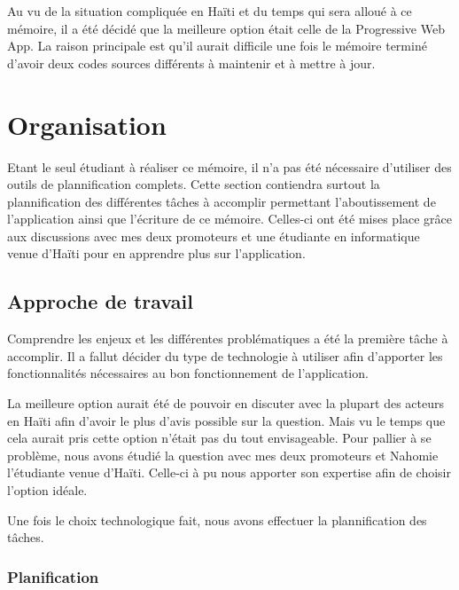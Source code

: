 \documentclass{EPL-master-thesis-covers-FR}
\begin{document}
			Au vu de la situation compliquée en Haïti et du temps qui sera alloué à ce mémoire, il a été décidé que la meilleure option était celle de la Progressive Web App. La raison principale est qu'il aurait difficile une fois le mémoire terminé d'avoir deux codes sources différents à maintenir et à mettre à jour.

	\chapter{Organisation}
		

		Etant le seul étudiant à réaliser ce mémoire, il n'a pas été nécessaire d'utiliser des outils de plannification complets. Cette section contiendra surtout la plannification des différentes tâches à accomplir permettant l'aboutissement de l'application ainsi que l'écriture de ce mémoire. Celles-ci ont été mises place grâce aux discussions avec mes deux promoteurs et une étudiante en informatique venue d'Haïti pour en apprendre plus sur l'application. 

		\section{Approche de travail}
			Comprendre les enjeux et les différentes problématiques a été la première tâche à accomplir. Il a fallut décider du type de technologie à utiliser afin d'apporter les fonctionnalités nécessaires au bon fonctionnement de l'application. 
			
			La meilleure option aurait été de pouvoir en discuter avec la plupart des acteurs en Haïti afin d'avoir le plus d'avis possible sur la question. Mais vu le temps que cela aurait pris cette option n'était pas du tout envisageable. Pour pallier à se problème, nous avons étudié la question avec mes deux promoteurs et Nahomie l'étudiante venue d'Haïti. Celle-ci à pu nous apporter son expertise afin de choisir l'option idéale.
			
			Une fois le choix technologique fait, nous avons effectuer la plannification des tâches.
		
		


			\subsection*{Planification}
				\label{sec:planification}

\end{document}
